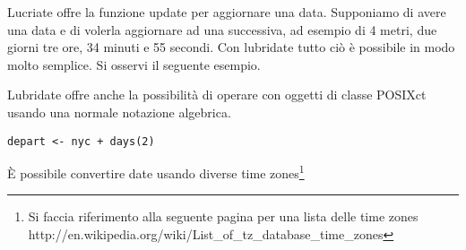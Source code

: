 Lucriate offre la funzione update per aggiornare una data. Supponiamo di avere una data e di volerla aggiornare ad una successiva, ad esempio di 4 metri, due giorni tre ore, 34 minuti e 55 secondi. Con lubridate tutto ciò è possibile in modo molto semplice. Si osservi il seguente esempio.

Lubridate offre anche la possibilità di operare con oggetti di classe POSIXct usando una normale notazione algebrica.

\begin{lstlisting}
depart <- nyc + days(2)
\end{lstlisting}

È possibile convertire date usando diverse time zones\footnote{Si faccia riferimento alla seguente pagina per una lista delle time zones http://en.wikipedia.org/wiki/List_of_tz_database_time_zones}
